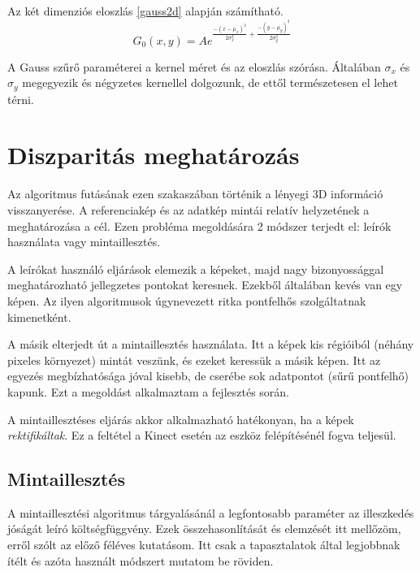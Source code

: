 Az két dimenziós eloszlás \eqref{gauss2d} alapján számítható.
\begin{equation}
G_0(x,y) = A e^{\frac{-(x-\mu_x)^2}{2 \sigma_x^2}+\frac{-(y-\mu_y)^2}{2 \sigma_y^2}}
\label{eq:gauss2d}
\end{equation}

A Gauss szűrő paraméterei a kernel méret és az eloszlás szórása.
Általában $\sigma_x$ és $\sigma_y$ megegyezik és négyzetes kernellel dolgozunk, de ettől természetesen el lehet térni.

\section{Diszparitás meghatározás}\label{sect:Depthproc}

Az algoritmus futásának ezen szakaszában történik a lényegi 3D információ visszanyerése.
A referenciakép és az adatkép mintái relatív helyzetének a meghatározása a cél.
Ezen probléma megoldására 2 módszer terjedt el: leírók használata vagy mintaillesztés.

A leírókat használó eljárások elemezik a képeket, majd nagy bizonyossággal meghatározható jellegzetes pontokat keresnek.
Ezekből általában kevés van egy képen.
Az ilyen algoritmusok úgynevezett ritka pontfelhős szolgáltatnak kimenetként.

A másik elterjedt út a mintaillesztés használata.
Itt a képek kis régióiból (néhány pixeles környezet) mintát veszünk, és ezeket keressük a másik képen.
Itt az egyezés megbízhatósága jóval kisebb, de cserébe sok adatpontot (sűrű pontfelhő) kapunk.
Ezt a megoldást alkalmaztam a fejlesztés során.

A mintaillesztéses eljárás akkor alkalmazható hatékonyan, ha a képek \emph{rektifikáltak}.
Ez a feltétel a Kinect esetén az eszköz felépítésénél fogva teljesül.

\subsection{Mintaillesztés}\label{sect:templateMatch}

A mintaillesztési algoritmus tárgyalásánál a legfontosabb paraméter az illeszkedés jóságát leíró költségfüggvény.
Ezek összehasonlítását és elemzését itt mellőzöm, erről szólt az előző féléves kutatásom.
Itt csak a tapasztalatok által legjobbnak ítélt és azóta használt módszert mutatom be röviden.

